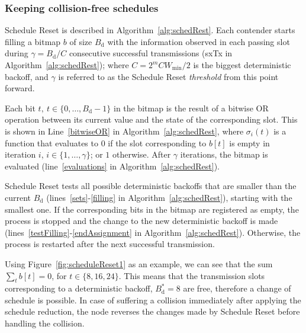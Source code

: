 		
		\subsubsection{Keeping collision-free schedules}
		Schedule Reset is described in Algorithm~\ref{alg:schedRest}. Each contender starts filling a bitmap $b$ of size $B_{\text{d}}$ with the information observed in each passing slot during $\gamma=B_{\text{d}}/C$ consecutive successful transmissions (sxTx in Algorithm~\ref{alg:schedRest}); where $C=2^{m}CW_{\min}/2$ is the biggest deterministic backoff, and $\gamma$ is referred to as the Schedule Reset \emph{threshold} from this point forward.
		
		Each bit $t,~t\in\{0,\ldots ,B_{\text{d}}-1\}$ in the bitmap is the result of a bitwise OR operation between its current value and the state of the corresponding slot. This is shown in Line~\ref{bitwiseOR} in Algorithm~\ref{alg:schedRest}, where $\sigma_{i}(t)$ is a function that evaluates to $0$ if the slot corresponding to $b[t]$ is empty in iteration $i$, $i \in\{1,\ldots,\gamma\}$; or $1$ otherwise. After $\gamma$ iterations, the bitmap is evaluated (line~\ref{evaluations} in Algorithm~\ref{alg:schedRest}).
		
		
		
		Schedule Reset tests all possible deterministic backoffs that are smaller than the current $B_{\text{d}}$ (lines~\ref{sets}-\ref{filling} in Algorithm~\ref{alg:schedRest}), starting with the smallest one. If the corresponding bits in the bitmap are registered as empty, the process is stopped and the change to the new deterministic backoff is made (lines~\ref{testFilling}-\ref{endAssignment} in Algorithm~\ref{alg:schedRest}). Otherwise, the process is restarted after the next successful transmission.
		
		Using Figure~\ref{fig:scheduleReset1} as an example, we can see that the sum $\sum\limits_{t} b[t]=0$, for $t\in\{8,16,24\}$. This means that the transmission slots corresponding to a deterministic backoff, $B^{*}_{\text{d}}=8$ are free, therefore a change of schedule is possible. In case of suffering a collision immediately after applying the schedule reduction, the node reverses the changes made by Schedule Reset before handling the collision.
		
